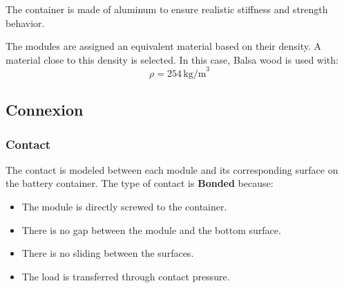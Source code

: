 \documentclass[a4paper,12pt]{article}
\begin{document}
		The container is made of aluminum to ensure realistic stiffness and strength behavior.
		
		\begin{figure}[H]
			\centering
			\label{fig:material}
		\end{figure}
		
		
		The modules are assigned an equivalent material based on their density. A material close to this density is selected. In this case, Balsa wood is used with:
		\[
		\rho = 254 \, \text{kg/m}^3
		\]
		
		\begin{figure}[H]
			\centering
		\end{figure}
	
	
	
	
	\subsection{Connexion}
	
		\subsubsection{Contact}
		
		The contact is modeled between each module and its corresponding surface on the battery container.  
		The type of contact is \textbf{Bonded} because:
		
		\begin{itemize}
			\item The module is directly screwed to the container.
			\item There is no gap between the module and the bottom surface.
			\item There is no sliding between the surfaces.
			\item The load is transferred through contact pressure.
		\end{itemize}
		
		\begin{figure}[H]
			\centering
		\end{figure}
		
\end{document}
